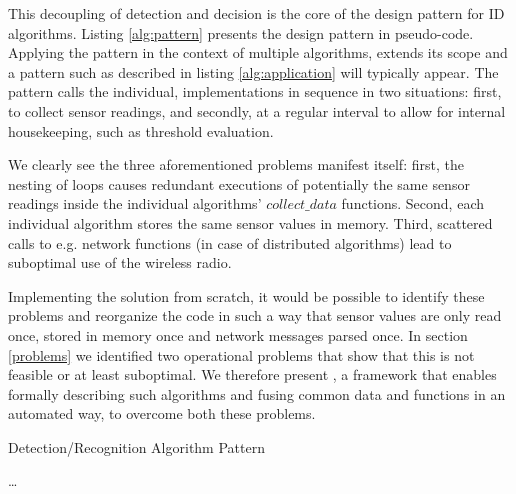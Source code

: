 \documentclass[3p,times,procedia]{elsarticle}
\begin{document}
This decoupling of detection and decision is the core of the design pattern for
ID algorithms. Listing \ref{alg:pattern} presents the design pattern in
pseudo-code. Applying the pattern in the context of multiple algorithms,
extends its scope and a pattern such as described in listing
\ref{alg:application} will typically appear. The pattern calls the individual,
implementations in sequence in two situations: first, to collect sensor
readings, and secondly, at a regular interval to allow for internal
housekeeping, such as threshold evaluation.

We clearly see the three aforementioned problems manifest itself: first, the
nesting of loops causes redundant executions of potentially the same sensor
readings inside the individual algorithms' $collect\_data$ functions. Second,
each individual algorithm stores the same sensor values in memory. Third,
scattered calls to e.g. network functions (in case of distributed algorithms)
lead to suboptimal use of the wireless radio.

Implementing the solution from scratch, it would be possible to identify these
problems and reorganize the code in such a way that sensor values are only read
once, stored in memory once and network messages parsed once. In section
\ref{problems} we identified two operational problems that show that this is
not feasible or at least suboptimal. We therefore present \FOO, a framework
that enables formally describing such algorithms and fusing common data and
functions in an automated way, to overcome both these problems.

\vspace{-2mm}

\begin{algorithm}[b]
  \caption{Detection/Recognition Algorithm Pattern}
  \label{alg:pattern}
  \begin{algorithmic}
     
           
          
      \EndFor
      \State {}  \label{alg:id-algo-pattern-send1}
    \EndFunction
       \label{alg:id-algo-pattern-loop2} \label{alg:id-algo-pattern-common-data}
         
          \State \dots {}
          \State {}  \label{alg:id-algo-pattern-send2}
        \EndIf
      \EndFor
    \EndFunction
  \end{algorithmic}
\end{algorithm}
\end{document}
